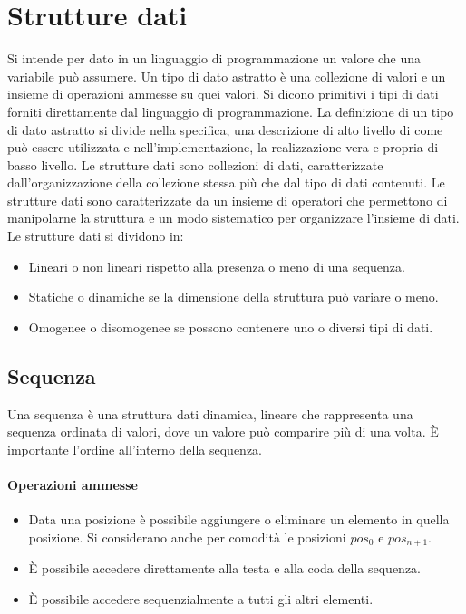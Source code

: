 \chapter{Strutture dati}
Si intende per dato in un linguaggio di programmazione un valore che una variabile pu\`o assumere. Un tipo di dato astratto \`e una collezione di valori e un
insieme di operazioni ammesse su quei valori. Si dicono primitivi i tipi di dati forniti direttamente dal linguaggio di programmazione. La definizione di un
tipo di dato astratto si divide nella specifica, una descrizione di alto livello di come pu\`o essere utilizzata e nell'implementazione, la realizzazione 
vera e propria di basso livello. Le strutture dati sono collezioni di dati, caratterizzate dall'organizzazione della collezione stessa pi\`u che dal tipo di
dati contenuti. Le strutture dati sono caratterizzate da un insieme di operatori che permettono di manipolarne la struttura e un modo sistematico per 
organizzare l'insieme di dati. Le strutture dati si dividono in:
\begin{itemize}
\item Lineari o non lineari rispetto alla presenza o meno di una sequenza.
\item Statiche o dinamiche se la dimensione della struttura pu\`o variare o meno.
\item Omogenee o disomogenee se possono contenere uno o diversi tipi di dati.
\end{itemize}
\section{Sequenza}
Una sequenza \`e una struttura dati dinamica, lineare che rappresenta una sequenza ordinata di valori, dove un valore pu\`o comparire pi\`u di una volta. \`E
importante l'ordine all'interno della sequenza. 
\subsubsection{Operazioni ammesse}
\begin{itemize}
\item Data una posizione \`e possibile aggiungere o eliminare un elemento in quella posizione. Si considerano anche per comodit\`a le posizioni $pos_0$ e 
$pos_{n+1}$.
\item \`E possibile accedere direttamente alla testa e alla coda della sequenza.
\item \`E possibile accedere sequenzialmente a tutti gli altri elementi.
\end{itemize}
